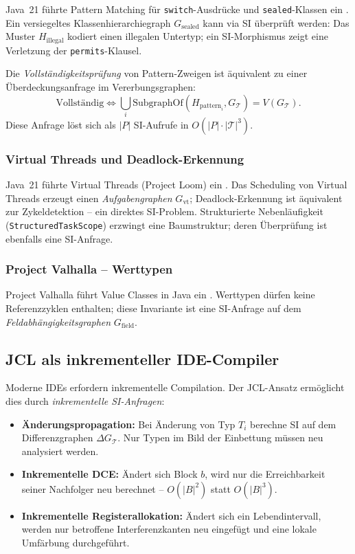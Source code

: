﻿\documentclass[a4paper,12pt]{article}
\theoremstyle{definition}
\begin{document}
Java~21 f\"uhrte Pattern Matching f\"ur \texttt{switch}-Ausdr\"ucke
und \texttt{sealed}-Klassen ein \cite{goetz2022}.  Ein versiegeltes
Klassenhierarchiegraph $G_{\text{sealed}}$ kann via SI \"uberpr\"uft
werden: Das Muster $H_{\text{illegal}}$ kodiert einen illegalen
Untertyp; ein SI-Morphismus zeigt eine Verletzung der
\texttt{permits}-Klausel.

Die \emph{Vollst\"andigkeitspr\"ufung} von Pattern-Zweigen ist
\"aquivalent zu einer \"Uberdeckungsanfrage im Vererbungsgraphen:
\[
\text{Vollst\"andig} \Leftrightarrow
\bigcup_{i} \mathrm{SubgraphOf}(H_{\text{pattern}_i},
G_{\mathcal{T}}) = V(G_{\mathcal{T}}).
\]
Diese Anfrage l\"ost sich als $|P|$ SI-Aufrufe in
$O(|P| \cdot |\mathcal{T}|^3)$.

\subsubsection{Virtual Threads und Deadlock-Erkennung}

Java~21 f\"uhrte Virtual Threads (Project Loom) ein \cite{goetz2023}.
Das Scheduling von Virtual Threads erzeugt einen
\emph{Aufgabengraphen} $G_{\text{vt}}$; Deadlock-Erkennung ist
\"aquivalent zur Zykeldetektion -- ein direktes SI-Problem.
Strukturierte Nebenl\"aufigkeit (\texttt{StructuredTaskScope})
erzwingt eine Baumstruktur; deren \"Uberpr\"ufung ist ebenfalls
eine SI-Anfrage.

\subsubsection{Project Valhalla -- Werttypen}

Project Valhalla f\"uhrt Value Classes in Java ein \cite{valhalla2024}.
Werttypen d\"urfen keine Referenzzyklen enthalten; diese Invariante
ist eine SI-Anfrage auf dem \emph{Feldabh\"angigkeitsgraphen}
$G_{\text{field}}$.

\subsection{JCL als inkrementeller IDE-Compiler}

Moderne IDEs erfordern inkrementelle Compilation.  Der JCL-Ansatz
erm\"oglicht dies durch \emph{inkrementelle SI-Anfragen}:

\begin{itemize}
    \item \textbf{\"Anderungspropagation:} Bei \"Anderung von Typ
          $T_i$ berechne SI auf dem Differenzgraphen $\Delta
          G_{\mathcal{T}}$.  Nur Typen im Bild der Einbettung m\"ussen
          neu analysiert werden.
    \item \textbf{Inkrementelle DCE:} \"Andert sich Block $b$, wird
          nur die Erreichbarkeit seiner Nachfolger neu berechnet --
          $O(|B|^2)$ statt $O(|B|^3)$.
    \item \textbf{Inkrementelle Registerallokation:} \"Andert sich
          ein Lebendintervall, werden nur betroffene Interferenzkanten
          neu eingef\"ugt und eine lokale Umf\"arbung durchgef\"uhrt.
\end{itemize}
\end{document}
